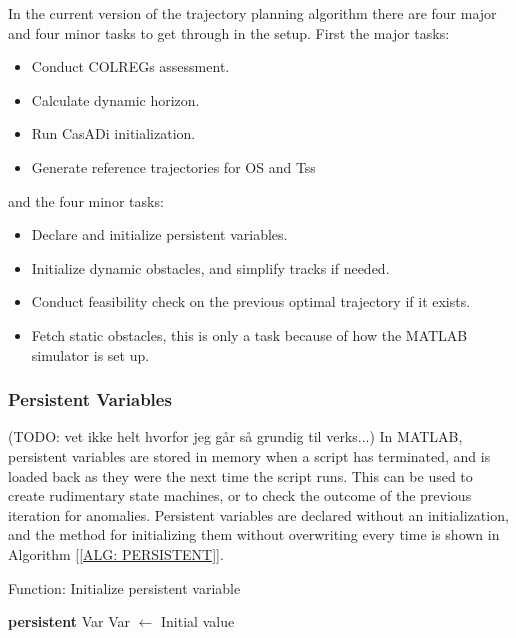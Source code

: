 In the current version of the trajectory planning algorithm there are four major and four minor tasks to get through
in the setup. First the major tasks:
\begin{itemize}
    \item Conduct COLREGs assessment.
    \item Calculate dynamic horizon.
    \item Run CasADi initialization.
    \item Generate reference trajectories for \gls{OS} and \gls{Ts}s
\end{itemize}
and the four minor tasks:
\begin{itemize}
    \item Declare and initialize persistent variables.
    \item Initialize dynamic obstacles, and simplify tracks if needed.
    \item Conduct feasibility check on the previous optimal trajectory if it exists.
    \item Fetch static obstacles, this is only a task because of how the MATLAB simulator is set up.
\end{itemize}

\subsubsection*{Persistent Variables} (TODO: vet ikke helt hvorfor jeg går så grundig til verks...)
In MATLAB, persistent variables are stored in memory when a script has terminated, and is loaded back as they were the next
time the script runs. This can be used to create rudimentary state machines, or to check the outcome of the previous iteration for anomalies.
Persistent variables are declared without an initialization, and the method for initializing them without overwriting every time is shown in Algorithm [\ref{ALG: PERSISTENT}].

\begin{algorithm}[ht]
    \caption{Function: Initialize persistent variable} \label{ALG: PERSISTENT}
    \begin{algorithmic}
        \State \textbf{persistent} Var
            \State Var $\gets$ Initial value
        \EndIf
    \end{algorithmic}
\end{algorithm}

